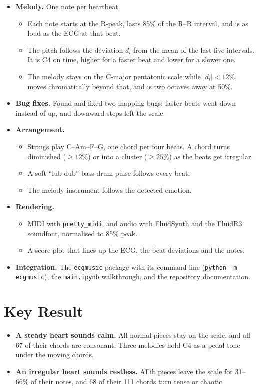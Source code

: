 \documentclass[11pt,a4paper]{article}
\begin{document}
\begin{itemize}
  \item \textbf{Melody.} One note per heartbeat.
    \begin{itemize}
      \item Each note starts at the R-peak, lasts 85\% of the R--R interval, and is as loud as
        the ECG at that beat.
      \item The pitch follows the deviation $d_i$ from the mean of the last five intervals. It is
        C4 on time, higher for a faster beat and lower for a slower one.
      \item The melody stays on the C-major pentatonic scale while $|d_i|<12\%$, moves
        chromatically beyond that, and is two octaves away at 50\%.
    \end{itemize}
  \item \textbf{Bug fixes.} Found and fixed two mapping bugs: faster beats went down instead of
    up, and downward steps left the scale.
  \item \textbf{Arrangement.}
    \begin{itemize}
      \item Strings play C--Am--F--G, one chord per four beats. A chord turns diminished
        ($\geq 12\%$) or into a cluster ($\geq 25\%$) as the beats get irregular.
      \item A soft ``lub-dub'' bass-drum pulse follows every beat.
      \item The melody instrument follows the detected emotion.
    \end{itemize}
  \item \textbf{Rendering.}
    \begin{itemize}
      \item MIDI with \texttt{pretty\_midi}, and audio with FluidSynth and the FluidR3 soundfont,
        normalised to 85\% peak.
      \item A score plot that lines up the ECG, the beat deviations and the notes.
    \end{itemize}
  \item \textbf{Integration.} The \texttt{ecgmusic} package with its command line
    (\texttt{python -m ecgmusic}), the \texttt{main.ipynb} walkthrough, and the repository
    documentation.
\end{itemize}

\section{Key Result}
\begin{itemize}
  \item \textbf{A steady heart sounds calm.} All normal pieces stay on the scale, and all 67 of
    their chords are consonant. Three melodies hold C4 as a pedal tone under the moving chords.
  \item \textbf{An irregular heart sounds restless.} AFib pieces leave the scale for 31--66\% of
    their notes, and 68 of their 111 chords turn tense or chaotic.
\end{itemize}
\end{document}
